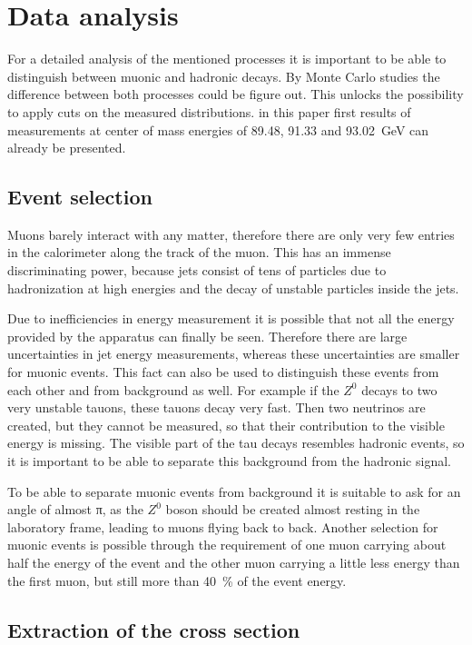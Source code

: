 \documentclass[epj,nopacs]{svjour}
\begin{document}
\section{ Data analysis}

For a detailed analysis of the mentioned processes it is important to be able
to distinguish between muonic and hadronic decays. By Monte Carlo studies the
difference between both processes could be figure out. This unlocks the
possibility to apply cuts on the measured distributions. in this paper first
results of measurements at center of mass energies of 89.48, 91.33 and
\SI{93.02}{\giga\electronvolt} can already be presented.

\subsection{ Event selection}
Muons barely interact with any matter, therefore there are only very few
entries in the calorimeter along the track of the muon. This has an immense
discriminating power, because jets consist of tens of particles due to
hadronization at high energies and the decay of unstable particles inside the
jets.

Due to inefficiencies in energy measurement it is possible that not all the
energy provided by the apparatus can finally be seen. Therefore there are large
uncertainties in jet energy measurements, whereas these uncertainties are
smaller for muonic events. This fact can also be used to distinguish these
events from each other and from background as well. For example if the $Z^0$
decays to two very unstable tauons, these tauons decay very fast. Then two
neutrinos are created, but they cannot be measured, so that their contribution
to the visible energy is missing. The visible part of the tau decays resembles
hadronic events, so it is important to be able to separate this background from
the hadronic signal.

To be able to separate muonic events from background it is suitable to ask for
an angle of almost π, as the $Z^0$ boson should be created almost resting in
the laboratory frame, leading to muons flying back to back. Another selection
for muonic events is possible through the requirement of one muon carrying
about half the energy of the event and the other muon carrying a little less
energy than the first muon, but still more than \SI{40}{\percent} of the event
energy.


\subsection{Extraction of the cross section}
\end{document}
